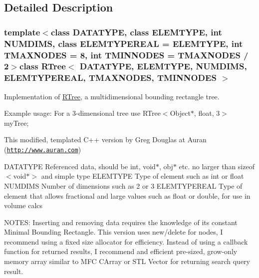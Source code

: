 \subsection{\-Detailed \-Description}
\subsubsection*{template$<$class \-D\-A\-T\-A\-T\-Y\-P\-E, class \-E\-L\-E\-M\-T\-Y\-P\-E, int \-N\-U\-M\-D\-I\-M\-S, class \-E\-L\-E\-M\-T\-Y\-P\-E\-R\-E\-A\-L = \-E\-L\-E\-M\-T\-Y\-P\-E, int \-T\-M\-A\-X\-N\-O\-D\-E\-S = 8, int \-T\-M\-I\-N\-N\-O\-D\-E\-S = \-T\-M\-A\-X\-N\-O\-D\-E\-S / 2$>$class R\-Tree$<$ D\-A\-T\-A\-T\-Y\-P\-E, E\-L\-E\-M\-T\-Y\-P\-E, N\-U\-M\-D\-I\-M\-S, E\-L\-E\-M\-T\-Y\-P\-E\-R\-E\-A\-L, T\-M\-A\-X\-N\-O\-D\-E\-S, T\-M\-I\-N\-N\-O\-D\-E\-S $>$}

\-Implementation of \hyperlink{class_r_tree}{\-R\-Tree}, a multidimensional bounding rectangle tree. 

\-Example usage\-: \-For a 3-\/dimensional tree use \-R\-Tree$<$\-Object$\ast$, float, 3$>$ my\-Tree;

\-This modified, templated \-C++ version by \-Greg \-Douglas at \-Auran (\href{http://www.auran.com}{\tt http\-://www.\-auran.\-com})

\-D\-A\-T\-A\-T\-Y\-P\-E \-Referenced data, should be int, void$\ast$, obj$\ast$ etc. no larger than sizeof$<$void$\ast$$>$ and simple type \-E\-L\-E\-M\-T\-Y\-P\-E \-Type of element such as int or float \-N\-U\-M\-D\-I\-M\-S \-Number of dimensions such as 2 or 3 \-E\-L\-E\-M\-T\-Y\-P\-E\-R\-E\-A\-L \-Type of element that allows fractional and large values such as float or double, for use in volume calcs

\-N\-O\-T\-E\-S\-: \-Inserting and removing data requires the knowledge of its constant \-Minimal \-Bounding \-Rectangle. \-This version uses new/delete for nodes, \-I recommend using a fixed size allocator for efficiency. \-Instead of using a callback function for returned results, \-I recommend and efficient pre-\/sized, grow-\/only memory array similar to \-M\-F\-C \-C\-Array or \-S\-T\-L \-Vector for returning search query result. 

